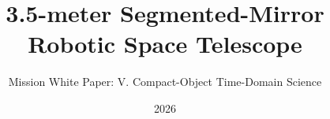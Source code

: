 \title{3.5-meter Segmented-Mirror Robotic Space Telescope}
\newcommand{\wpvolumelabel}{V}
\newcommand{\wpvolumetitle}{Compact-Object Time-Domain Science}
\subtitle{Mission White Paper: \wpvolumelabel. \wpvolumetitle}
\newcommand{\wpauthors}{Juhan Kim, Yong-Woo Kang, Sang Hyun Lee, Jeong-Yeol Han, Sungwook E. Hong, Bongkon Moon, Donguk Song, Juhyung Kang, Myeong-Gu Park, Sang Chul Kim, Chung-Uk Lee, Sangmo Tony Sohn, Arman Shafieloo, David Parkinson, Hong Soo Park, Dohyeong Kim, Chan Park, Jungjoo Sohn, Young-Beom Jeon, Jong-Hak Woo, Hyung Mok Lee, Hong Bae Ann, Myungkook James Jee, Mansoo Choi, Changbom Park}
\date{2026}
\newcommand{\wpchapteroffset}{3}
\newcommand{\MakeVolumeBody}{%
  \definecolor{Blue1}{HTML}{D98A9A}%
  \definecolor{Blue2}{HTML}{B34F68}%
  \definecolor{Blue3}{HTML}{7A2944}%
  }
